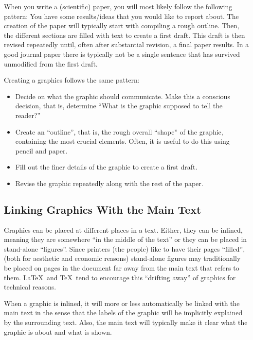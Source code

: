 When you write a (scientific) paper, you will most likely follow the following
pattern: You have some results/ideas that you would like to report about. The
creation of the paper will typically start with compiling a rough outline.
Then, the different sections are filled with text to create a first draft. This
draft is then revised repeatedly until, often after substantial revision, a
final paper results. In a good journal paper there is typically not be a single
sentence that has survived unmodified from the first draft.

Creating a graphics follows the same pattern:
%
\begin{itemize}
    \item Decide on what the graphic should communicate. Make this a
        conscious decision, that is, determine ``What is the graphic supposed
        to tell the reader?''
    \item Create an ``outline'', that is, the rough overall ``shape'' of the
        graphic, containing the most crucial elements. Often, it is useful to
        do this using pencil and paper.
    \item Fill out the finer details of the graphic to create a first draft.
    \item Revise the graphic repeatedly along with the rest of the paper.
\end{itemize}


\subsection{Linking Graphics With the Main Text}

Graphics can be placed at different places in a text. Either, they can be
inlined, meaning they are somewhere ``in the middle of the text'' or they can
be placed in stand-alone ``figures''. Since printers (the people) like to have
their pages ``filled'', (both for aesthetic and economic reasons) stand-alone
figures may traditionally be placed on pages in the document far away from the
main text that refers to them. \LaTeX\ and \TeX\ tend to encourage this
``drifting away'' of graphics for technical reasons.

When a graphic is inlined, it will more or less automatically be linked with
the main text in the sense that the labels of the graphic will be implicitly
explained by the surrounding text. Also, the main text will typically make it
clear what the graphic is about and what is shown.

